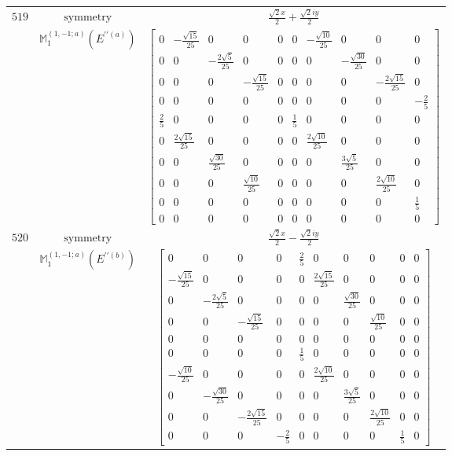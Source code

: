 \documentclass[fleqn,8pt,landscape]{jsarticle}
\begin{document}
\begin{longtable}{ccc}
$ 519 $ & $ \text{symmetry} $ & $ \frac{\sqrt{2} x}{2} + \frac{\sqrt{2} i y}{2} $ \\
$  $ & $ \mathbb{M}_{1}^{(1,-1;a)}(E^{\prime\prime(a)}) $ & $ \begin{bmatrix} 0 & - \frac{\sqrt{15}}{25} & 0 & 0 & 0 & 0 & - \frac{\sqrt{10}}{25} & 0 & 0 & 0 \\ 0 & 0 & - \frac{2 \sqrt{5}}{25} & 0 & 0 & 0 & 0 & - \frac{\sqrt{30}}{25} & 0 & 0 \\ 0 & 0 & 0 & - \frac{\sqrt{15}}{25} & 0 & 0 & 0 & 0 & - \frac{2 \sqrt{15}}{25} & 0 \\ 0 & 0 & 0 & 0 & 0 & 0 & 0 & 0 & 0 & - \frac{2}{5} \\ \frac{2}{5} & 0 & 0 & 0 & 0 & \frac{1}{5} & 0 & 0 & 0 & 0 \\ 0 & \frac{2 \sqrt{15}}{25} & 0 & 0 & 0 & 0 & \frac{2 \sqrt{10}}{25} & 0 & 0 & 0 \\ 0 & 0 & \frac{\sqrt{30}}{25} & 0 & 0 & 0 & 0 & \frac{3 \sqrt{5}}{25} & 0 & 0 \\ 0 & 0 & 0 & \frac{\sqrt{10}}{25} & 0 & 0 & 0 & 0 & \frac{2 \sqrt{10}}{25} & 0 \\ 0 & 0 & 0 & 0 & 0 & 0 & 0 & 0 & 0 & \frac{1}{5} \\ 0 & 0 & 0 & 0 & 0 & 0 & 0 & 0 & 0 & 0 \end{bmatrix} $ \\ \hline
$ 520 $ & $ \text{symmetry} $ & $ \frac{\sqrt{2} x}{2} - \frac{\sqrt{2} i y}{2} $ \\
$  $ & $ \mathbb{M}_{1}^{(1,-1;a)}(E^{\prime\prime(b)}) $ & $ \begin{bmatrix} 0 & 0 & 0 & 0 & \frac{2}{5} & 0 & 0 & 0 & 0 & 0 \\ - \frac{\sqrt{15}}{25} & 0 & 0 & 0 & 0 & \frac{2 \sqrt{15}}{25} & 0 & 0 & 0 & 0 \\ 0 & - \frac{2 \sqrt{5}}{25} & 0 & 0 & 0 & 0 & \frac{\sqrt{30}}{25} & 0 & 0 & 0 \\ 0 & 0 & - \frac{\sqrt{15}}{25} & 0 & 0 & 0 & 0 & \frac{\sqrt{10}}{25} & 0 & 0 \\ 0 & 0 & 0 & 0 & 0 & 0 & 0 & 0 & 0 & 0 \\ 0 & 0 & 0 & 0 & \frac{1}{5} & 0 & 0 & 0 & 0 & 0 \\ - \frac{\sqrt{10}}{25} & 0 & 0 & 0 & 0 & \frac{2 \sqrt{10}}{25} & 0 & 0 & 0 & 0 \\ 0 & - \frac{\sqrt{30}}{25} & 0 & 0 & 0 & 0 & \frac{3 \sqrt{5}}{25} & 0 & 0 & 0 \\ 0 & 0 & - \frac{2 \sqrt{15}}{25} & 0 & 0 & 0 & 0 & \frac{2 \sqrt{10}}{25} & 0 & 0 \\ 0 & 0 & 0 & - \frac{2}{5} & 0 & 0 & 0 & 0 & \frac{1}{5} & 0 \end{bmatrix} $ \\ \hline

\end{longtable}
\end{document}
